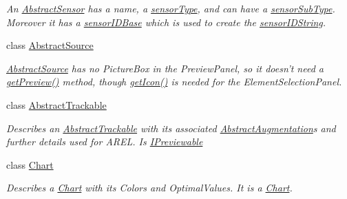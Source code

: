 \begin{DoxyCompactItemize}
\begin{DoxyCompactList}\small\item\em An \hyperlink{class_a_rdev_kit_1_1_model_1_1_project_1_1_abstract_sensor}{Abstract\-Sensor} has a name, a \hyperlink{class_a_rdev_kit_1_1_model_1_1_project_1_1_abstract_sensor_a01251db96ea5e0fb0abe1df0a129e751}{sensor\-Type}, and can have a \hyperlink{class_a_rdev_kit_1_1_model_1_1_project_1_1_abstract_sensor_a29b9e916f374e31196689e9d7ac73123}{sensor\-Sub\-Type}. Moreover it has a \hyperlink{class_a_rdev_kit_1_1_model_1_1_project_1_1_abstract_sensor_a2f9524a6aba4331373c0c1968b2f6f4d}{sensor\-I\-D\-Base} which is used to create the \hyperlink{class_a_rdev_kit_1_1_model_1_1_project_1_1_abstract_sensor_ae12a6c3bfe5686d888d7e36c9b19df47}{sensor\-I\-D\-String}. \end{DoxyCompactList}\item 
class \hyperlink{class_a_rdev_kit_1_1_model_1_1_project_1_1_abstract_source}{Abstract\-Source}
\begin{DoxyCompactList}\small\item\em \hyperlink{class_a_rdev_kit_1_1_model_1_1_project_1_1_abstract_source}{Abstract\-Source} has no Picture\-Box in the Preview\-Panel, so it doesn't need a \hyperlink{class_a_rdev_kit_1_1_model_1_1_project_1_1_abstract_source_abd9f742efb27a1fca992f6627c0421e4}{get\-Preview()} method, though \hyperlink{class_a_rdev_kit_1_1_model_1_1_project_1_1_abstract_source_ae698f1c9d55cc0603931bd2804d0c35d}{get\-Icon()} is needed for the Element\-Selection\-Panel. \end{DoxyCompactList}\item 
class \hyperlink{class_a_rdev_kit_1_1_model_1_1_project_1_1_abstract_trackable}{Abstract\-Trackable}
\begin{DoxyCompactList}\small\item\em Describes an \hyperlink{class_a_rdev_kit_1_1_model_1_1_project_1_1_abstract_trackable}{Abstract\-Trackable} with its associated \hyperlink{class_a_rdev_kit_1_1_model_1_1_project_1_1_abstract_augmentation}{Abstract\-Augmentation}s and further details used for A\-R\-E\-L. Is \hyperlink{interface_a_rdev_kit_1_1_model_1_1_project_1_1_i_previewable}{I\-Previewable} \end{DoxyCompactList}\item 
class \hyperlink{class_a_rdev_kit_1_1_model_1_1_project_1_1_chart}{Chart}
\begin{DoxyCompactList}\small\item\em Describes a \hyperlink{class_a_rdev_kit_1_1_model_1_1_project_1_1_chart}{Chart} with its Colors and Optimal\-Values. It is a \hyperlink{class_a_rdev_kit_1_1_model_1_1_project_1_1_chart}{Chart}. \end{DoxyCompactList}\item 

\end{DoxyCompactItemize}
